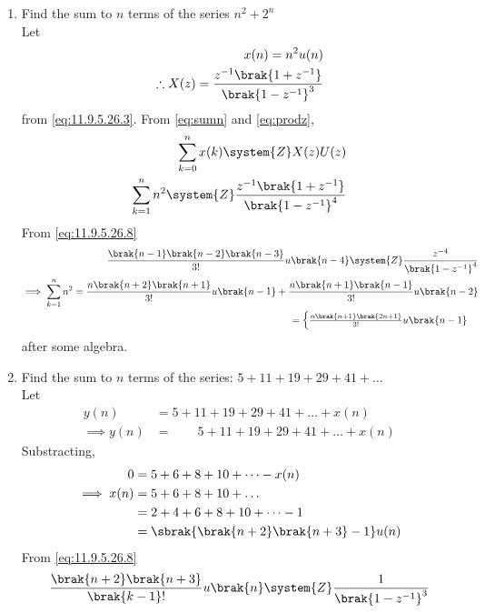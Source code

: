 \begin{enumerate}[label=\thesubsection.\arabic*,ref=\thesubsection.\theenumi]
%
\item Find the sum to $n$ terms of the series
$n^2 + 2^n$
\\
\solution
Let
\begin{align}
	\label{eq:x-1}
	x(n) = 
	n^2u(n)	
	\\
	\therefore
X(z)=
          \frac{z^{-1}\brak{1+z^{-1}}}{\brak{1-z^{-1}}^3}
\end{align}
from
\eqref{eq:11.9.5.26.3}.
From
	\eqref{eq:sumn}
	and 
\eqref{eq:prodz},
	\begin{align}
		\sum_{k=0}^{n}x(k) \system{Z} X(z)U(z)
	\\
        \sum_{k=1}^{n}n^2   \system{Z}\frac{z^{-1}\brak{1+z^{-1}}}{\brak{1-z^{-1}}^4}
	\end{align}
From
\eqref{eq:11.9.5.26.8}
\begin{align}
          \frac{\brak{n-1}\brak{n-2}\brak{n-3}}{3!}u\brak{n-4}\system{Z} \frac{z^{-4}}{\brak{1-z^{-1}}^4}
	  \\
	  \implies
\sum_{k=1}^{n}n^2   
=
          \frac{n\brak{n+2}\brak{n+1}}{3!}u\brak{n-1}
	  +
          \frac{n\brak{n+1}\brak{n-1}}{3!}u\brak{n-2}
	  \\
	  =
	  \begin{cases}
          \frac{n\brak{n+1}\brak{2n+1}}{3!}u\brak{n-1}
	  \end{cases}
\end{align}
after some algebra.
	\item Find the sum to $n$ terms of the series: $5+11+19+29+41+\dots$
		\\
		\solution Let
		\begin{align}
			y(n) &= 5+11+19+29+41+\dots+x(n)
			\\
			\implies 
			y(n) &= \qquad 5+11+19+29+41+\dots+x(n)
		\end{align}
		Substracting, 
		\begin{align}
			0 &= 5+6+8+10+\dots-x(n)
			\\
			\implies 
			x(n) &= 5+6+8+10+\dots
			\\
			 &= 2+4+6+8+10+\dots -1
			\\
			 &= \sbrak{\brak{n+2}\brak{n+3}-1}u(n)
		\end{align}
	  From \eqref{eq:11.9.5.26.8}
	  \begin{align}
          \frac{\brak{n+2}\brak{n+3}}{\brak{k-1}!}u\brak{n}\system{Z} \frac{1}{\brak{1-z^{-1}}^3}
	  \\

\end{align}
\end{enumerate}
